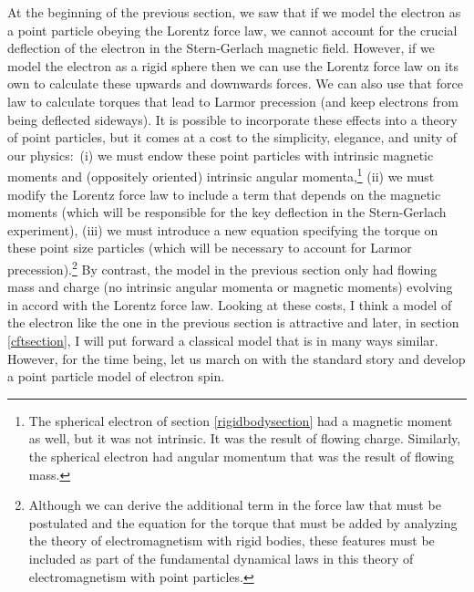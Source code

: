 \documentclass[onecolumn,secnumarabic,amsmath,amssymb,balancelastpage,nofootinbib]{article}
\begin{document}
At the beginning of the previous section, we saw that if we model the electron as a point particle obeying the Lorentz force law, we cannot account for the crucial deflection of the electron in the Stern-Gerlach magnetic field.  However, if we model the electron as a rigid sphere then we can use the Lorentz force law on its own to calculate these upwards and downwards forces.  We can also use that force law to calculate torques that lead to Larmor precession (and keep electrons from being deflected sideways).  It is possible to incorporate these effects into a theory of point particles, but it comes at a cost to the simplicity, elegance, and unity of our physics:\ (i) we must endow these point particles with intrinsic magnetic moments and (oppositely oriented) intrinsic angular momenta,\footnote{The spherical electron of section \ref{rigidbodysection} had a magnetic moment as well, but it was not intrinsic.  It was the result of flowing charge.  Similarly, the spherical electron had angular momentum that was the result of flowing mass.} (ii) we must modify the Lorentz force law to include a term that depends on the magnetic moments (which will be responsible for the key deflection in the Stern-Gerlach experiment), (iii) we must introduce a new equation specifying the torque on these point size particles (which will be necessary to account for Larmor precession).\footnote{Although we can derive the additional term in the force law that must be postulated and the equation for the torque that must be added by analyzing the theory of electromagnetism with rigid bodies, these features must be included as part of the fundamental dynamical laws in this theory of electromagnetism with point particles.}  By contrast, the model in the previous section only had flowing mass and charge (no intrinsic angular momenta or magnetic moments) evolving in accord with the Lorentz force law.  Looking at these costs, I think a model of the electron like the one in the previous section is attractive and later, in section \ref{cftsection}, I will put forward a classical model that is in many ways similar.  However, for the time being, let us march on with the standard story and develop a point particle model of electron spin.
\end{document}
